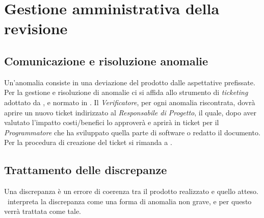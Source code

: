 \section{Gestione amministrativa della revisione}
\subsection{Comunicazione e risoluzione anomalie}
Un'anomalia consiste in una deviazione del prodotto dalle aspettative prefissate. Per la gestione e risoluzione di anomalie ci si affida allo strumento di
\textit{ticketing} adottato da \gruppo, e normato in \infoNDP. 
Il \textit{Verificatore}, per ogni anomalia riscontrata, dovrà aprire un nuovo ticket indirizzato al \textit{Responsabile di Progetto}, il quale, dopo aver valutato l'impatto costi/benefici lo approverà e aprirà in ticket per il \textit{Programmatore} che ha sviluppato quella parte di software o redatto il documento.
Per la procedura di creazione del ticket si rimanda a \infoNDP.
\subsection{Trattamento delle discrepanze}
Una discrepanza è un errore di coerenza tra il prodotto realizzato e quello atteso. \gruppo ~interpreta la discrepanza come una forma di anomalia non grave, e per questo verrà trattata come tale.